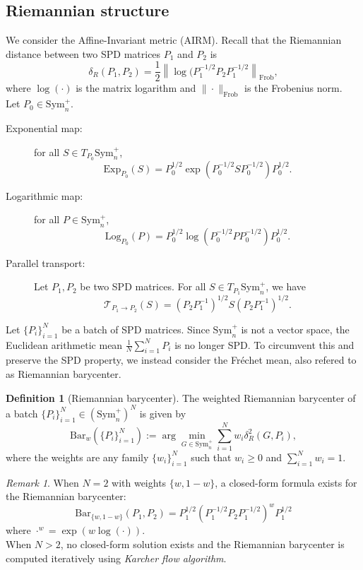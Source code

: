 \documentclass[10pt,a4paper]{book}
\theoremstyle{definition}
\newtheorem{defn}{Definition}[section]
\theoremstyle{plain}
\theoremstyle{remark}
\newtheorem{rmk}{Remark}[section]
\begin{document}
\subsection{Riemannian structure}
We consider the Affine-Invariant metric (AIRM). Recall that the Riemannian distance between two SPD matrices $P_1$ and $P_2$ is
$$\delta_{R}(P_1,P_2)=\frac{1}{2}\left\|\log(P_1^{-1/2}P_2P_1^{-1/2}\right\|_{\text{Frob}},$$
where $\log(\cdot)$ is the matrix logarithm and $\|\cdot\|_{\text{Frob}}$ is the Frobenius norm. 
\\ Let $P_0\in \text{Sym}_{n}^{+}$. 
\begin{description}
\item[Exponential map:] for all $S\in T_{P_0}\text{Sym}_n^{+}$, 
$$\text{Exp}_{P_0}(S)=P_0^{1/2}\exp(P_0^{-1/2}SP_0^{-1/2})P_0^{1/2}.$$
\item[Logarithmic map:] for all $P\in \text{Sym}_n^{+}$, 
$$\text{Log}_{P_0}(P)=P_0^{1/2}\log(P_0^{-1/2}PP_0^{-1/2})P_0^{1/2}.$$
\item[Parallel transport:] Let $P_1, P_2$ be two SPD matrices. For all $S\in T_{P_1}\text{Sym}_{n}^{+}$, we have
$$\mathcal{T}_{P_1\to P_2}(S)=(P_2P_1^{-1})^{1/2}S(P_2P_1^{-1})^{1/2}.$$ 
\end{description}
Let $\{P_i\}_{i=1}^{N}$ be a batch of SPD matrices. Since $\text{Sym}_n^{+}$ is not a vector space, the Euclidean arithmetic mean $\frac{1}{N}\sum_{i=1}^{N}P_i$ is no longer SPD. To circumvent this and preserve the SPD property, we instead consider the Fréchet mean, also refered to as Riemannian barycenter.

\begin{defn}[Riemannian barycenter]
The weighted Riemannian barycenter of a batch $\{P_i\}_{i=1}^{N} \in (\text{Sym}_n^{+})^{N}$ is given by
$$\text{Bar}_{w}(\{P_i\}_{i=1}^{N}):=\arg \min_{G\in \text{Sym}_n^{+}}\sum_{i=1}^{N}w_i\delta_R^{2}(G,P_i),$$
where the weights are any family $\{w_i\}_{i=1}^{N}$ such that $w_i\ge 0$ and $\sum_{i=1}^{N}w_i=1$.
\end{defn}
\begin{rmk}
When $N=2$ with weights $\{w,1-w\}$, a closed-form formula exists for the Riemannian barycenter:
$$\text{Bar}_{\{w,1-w\}}(P_1,P_2)=P_1^{1/2}(P_1^{-1/2}P_2P_1^{-1/2})^{w}P_1^{1/2}$$
where $\cdot^{w}=\exp(w \log(\cdot))$.\\
When $N>2$, no closed-form solution exists and the Riemannian barycenter is computed iteratively using \emph{Karcher flow algorithm}. 
\end{rmk}
\end{document}
